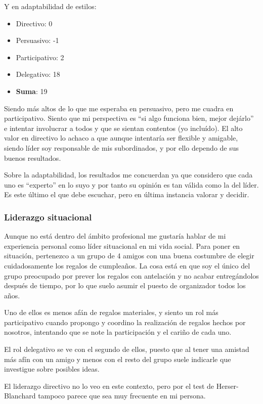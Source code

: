 Y en adaptabilidad de estilos:
\begin{itemize}
    \item Directivo: 0
    \item Persuasivo: -1
    \item Participativo: 2
    \item Delegativo: 18
    \item \textbf{Suma}: 19
\end{itemize}

Siendo más altos de lo que me esperaba en persuasivo, pero me cuadra en participativo. Siento que mi perspectiva es ``si algo funciona bien, mejor dejárlo'' e intentar involucrar a todos y que se sientan contentos (yo incluído). El alto valor en directivo lo achaco a que aunque intentaría ser flexible y amigable, siendo líder soy responsable de mis subordinados, y por ello dependo de sus buenos resultados.

Sobre la adaptabilidad, los resultados me concuerdan ya que considero que cada uno es ``experto'' en lo suyo y por tanto su opinión es tan válida como la del líder. Es este último el que debe escuchar, pero en última instancia valorar y decidir.

\subsubsection{Liderazgo situacional}


Aunque no está dentro del ámbito profesional me gustaría hablar de mi experiencia personal como líder situacional en mi vida social. 
Para poner en situación, pertenezco a un grupo de 4 amigos con una buena costumbre de elegir cuidadosamente los regalos de cumpleaños. La cosa está en que soy el único del grupo preocupado por prever los regalos con antelación y no acabar entregándolos después de tiempo, por lo que suelo asumir el puesto de organizador todos los años.

\vspace{\baselineskip}

Uno de ellos es menos afán de regalos materiales, y siento un rol más participativo cuando propongo y coordino la realización de regalos hechos por nosotros, intentando que se note la participación y el cariño de cada uno.

El rol delegativo se ve con el segundo de ellos, puesto que al tener una amistad más afín con un amigo y menos con el resto del grupo suele indicarle que investigue sobre posibles ideas.

El liderazgo directivo no lo veo en este contexto, pero por el test de Herser-Blanchard tampoco parece que sea muy frecuente en mi persona.


